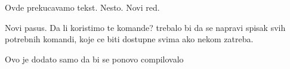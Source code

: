 Ovde prekucavamo tekst. Nesto.
Novi red.

Novi pasus. Da li koristimo te komande?
trebalo bi da se napravi spisak svih potrebnih komandi, koje ce biti dostupne svima ako nekom zatreba.

Ovo je dodato samo da bi se ponovo compilovalo 


